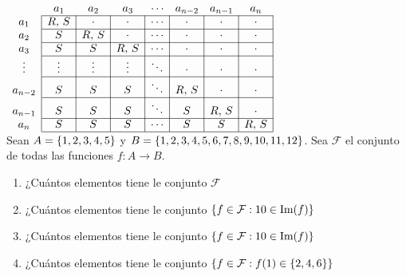 $
	\begin{array}{c|c|c|c|c|c|c|c|}
		\multicolumn{1}{c}{} & \multicolumn{1}{c}{a_1} & \multicolumn{1}{c}{a_2} & \multicolumn{1}{c}{a_3} & \multicolumn{1}{c}{\cdots} & \multicolumn{1}{c}{a_{n-2}} & \multicolumn{1}{c}{a_{n-1}} & \multicolumn{1}{c}{a_n} \\ \cline{2-8}
		a_1                  & R,\, S                  & \cdot                   & \cdot                   & \cdots                     & \cdot                       & \cdot                       & \cdot                   \\ \cline{2-8}
		a_2                  & S                       & R,\, S                  & \cdot                   & \cdots                     & \cdot                       & \cdot                       & \cdot                   \\ \cline{2-8}
		a_3                  & S                       & S                       & R,\, S                  & \cdots                     & \cdot                       & \cdot                       & \cdot                   \\ \cline{2-8}
		\vdots               & \vdots                  & \vdots                  & \vdots                  & \ddots                     & \cdot                       & \cdot                       & \cdot                   \\ \cline{2-8}
		a_{n-2}              & S                       & S                       & S                       & \ddots                     & R,\, S                      & \cdot                       & \cdot                   \\ \cline{2-8}
		a_{n-1}              & S                       & S                       & S                       & \ddots                     & S                           & R,\, S                      & \cdot                   \\ \cline{2-8}
		a_n                  & S                       & S                       & S                       & \cdots                     & S                           & S                           & R,\, S                  \\ \cline{2-8}
	\end{array}
$\\

\ejercicio
Sean $A = \left\{ 1,2,3,4,5 \right\}$ y $B = \left\{ 1,2,3,4,5,6,7,8,9,10,11,12 \right\}$. Sea $\mathcal F$ el conjunto de todas las funciones
$f: A \to B$.
\begin{enumerate}[label=\roman*)]
	\item  ¿Cuántos elementos tiene le conjunto $\mathcal F$
	\item  ¿Cuántos elementos tiene le conjunto $\left\{ f \in \mathcal F : 10 \in \text{Im}(f)  \right\}$
	\item  ¿Cuántos elementos tiene le conjunto $\left\{ f \in \mathcal F : 10 \in \text{Im}(f) \right\}$
	\item  ¿Cuántos elementos tiene le conjunto $\left\{ f \in \mathcal F : f(1) \in \left\{ 2,4,6 \right\}  \right\}$
\end{enumerate}

